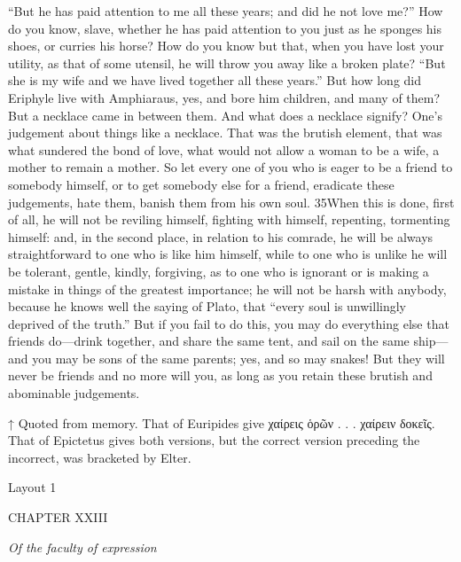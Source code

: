 ``But he has paid attention to me all these years; and did he not love me?'' How do you know, slave, whether he has paid attention to you just as he sponges his shoes, or curries his horse? How do you know but that, when you have lost your utility, as that of some utensil, he will throw you away like a broken plate? ``But she is my wife and we have lived together all these years.'' But how long did Eriphyle live with Amphiaraus, yes, and bore him children, and many of them? But a necklace came in between them. And what does a necklace signify? One's judgement about things like a necklace. That was the brutish element, that was what sundered the bond of love, what would not allow a woman to be a wife, a mother to remain a mother. So let every one of you who is eager to be a friend to somebody himself, or to get somebody else for a friend, eradicate these judgements, hate them, banish them from his own soul. 35When this is done, first of all, he will not be reviling himself, fighting with himself, repenting, tormenting himself: and, in the second place, in relation to his comrade, he will be always straightforward to one who is like him himself, while to one who is unlike he will be tolerant, gentle, kindly, forgiving, as to one who is ignorant or is making a mistake in things of the greatest importance; he will not be harsh with anybody, because he knows well the saying of Plato, that ``every soul is unwillingly deprived of the truth.'' But if you fail to do this, you may do everything else that friends do—drink together, and share the same tent, and sail on the same ship—and you may be sons of the same parents; yes, and so may snakes! But they will never be friends and no more will you, as long as you retain these brutish and abominable judgements.



↑ Quoted from memory. That of Euripides give χαίρεις ὁρῶν . . . χαίρειν δοκεῖς. That of Epictetus gives both versions, but the correct version preceding the incorrect, was bracketed by Elter.


Layout 1

CHAPTER XXIII

\emph{Of the faculty of expression}

